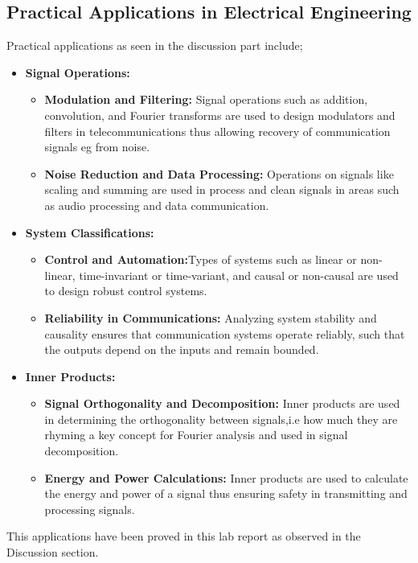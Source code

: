\documentclass[12pt]{article}
\begin{document}
\subsection{Practical Applications in Electrical Engineering}
Practical applications as seen in the discussion part include;
\begin{itemize}
    \item \textbf{Signal Operations:}
    \begin{itemize}
        \item \textbf{Modulation and Filtering:} Signal operations such as addition, convolution, and Fourier transforms are used to design modulators and filters in telecommunications thus allowing recovery of communication signals eg from noise.
        \item \textbf{Noise Reduction and Data Processing:} Operations on signals like scaling and  summing are used in process and clean signals in areas such as audio processing and data communication.
    \end{itemize}
    
    \item \textbf{System Classifications:}
    \begin{itemize}
        \item \textbf{Control and Automation:}Types of systems such as linear or non-linear, time-invariant or time-variant, and causal or non-causal are used to design robust control systems.
        \item \textbf{Reliability in Communications:} Analyzing system stability and causality ensures that communication systems operate reliably, such that the outputs depend on the inputs and remain bounded.
    \end{itemize}
    
    \item \textbf{Inner Products:}
    \begin{itemize}
        \item \textbf{Signal Orthogonality and Decomposition:} Inner products are used in determining the orthogonality between signals,i.e how much they are rhyming a key concept for Fourier analysis and used in signal decomposition.
        \item \textbf{Energy and Power Calculations:} Inner products are used to calculate the energy and power of a signal thus ensuring safety in transmitting and processing signals.
    \end{itemize}
\end{itemize}
This applications have been proved in this lab report as observed in the Discussion section.
\end{document}
